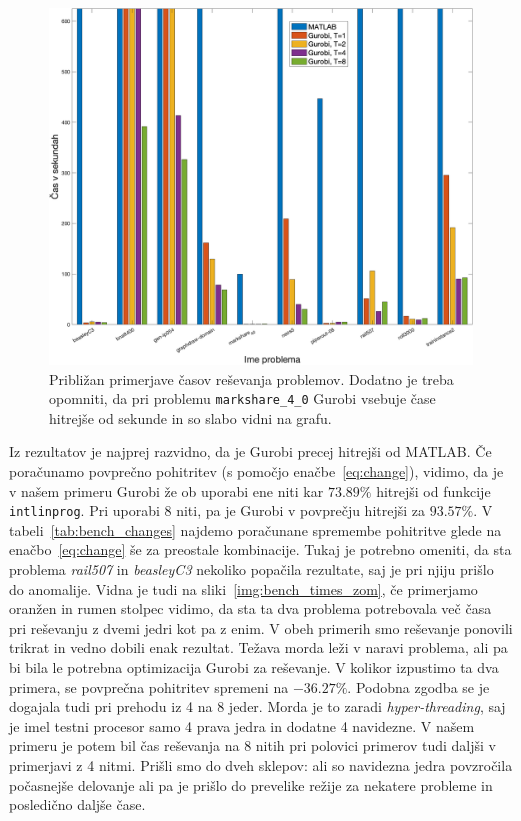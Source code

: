 \documentclass[a4paper,11pt]{article}
\begin{document}
\begin{figure}[htpb]
	\centering
	\includegraphics[width=\textwidth]{images/benchmark_times_zoom.png}
	\caption{Približan primerjave časov reševanja problemov. Dodatno je treba opomniti, da pri problemu \texttt{markshare\_4\_0} Gurobi vsebuje čase hitrejše od sekunde in so slabo vidni na grafu.}
	\label{img:bench_times_zoom}
\end{figure}

Iz rezultatov je najprej razvidno, da je Gurobi precej hitrejši od MATLAB. Če poračunamo povprečno pohitritev (s pomočjo enačbe~\ref{eq:change}), vidimo, da je v našem primeru Gurobi že ob uporabi ene niti kar $73.89 \%$ hitrejši od funkcije \texttt{intlinprog}. Pri uporabi 8 niti, pa je Gurobi v povprečju hitrejši za $93.57\%$. V tabeli~\ref{tab:bench_changes} najdemo poračunane spremembe pohitritve glede na enačbo~\ref{eq:change} še za preostale kombinacije. Tukaj je potrebno omeniti, da sta problema \textit{rail507} in \textit{beasleyC3} nekoliko popačila rezultate, saj je pri njiju prišlo do anomalije. Vidna je tudi na sliki~\ref{img:bench_times_zom}, če primerjamo oranžen in rumen stolpec vidimo, da sta ta dva problema potrebovala več časa pri reševanju z dvemi jedri kot pa z enim. V obeh primerih smo reševanje ponovili trikrat in vedno dobili enak rezultat. Težava morda leži v naravi problema, ali pa bi bila le potrebna optimizacija Gurobi za reševanje. V kolikor izpustimo ta dva primera, se povprečna pohitritev spremeni na $-36.27\%$. Podobna zgodba se je dogajala tudi pri prehodu iz 4 na 8 jeder. Morda je to zaradi \textit{hyper-threading}, saj je imel testni procesor samo 4 prava jedra in dodatne 4 navidezne. V našem primeru je potem bil čas reševanja na 8 nitih pri polovici primerov tudi daljši v primerjavi z 4 nitmi. Prišli smo do dveh sklepov: ali so navidezna jedra povzročila počasnejše delovanje ali pa je prišlo do prevelike režije za nekatere probleme in posledično daljše čase.
\end{document}

